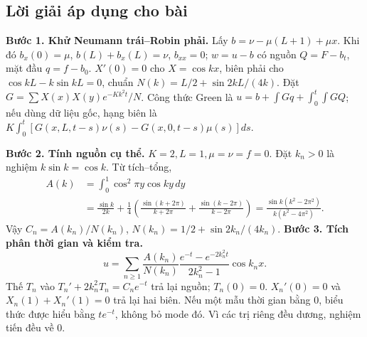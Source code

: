 \documentclass[10pt,a4paper]{article}
\begin{document}
\subsection*{Lời giải áp dụng cho bài}
\textbf{Bước 1. Khử Neumann trái–Robin phải.}
Lấy $b=\nu-\mu(L+1)+\mu x$. Khi đó $b_x(0)=\mu$, $b(L)+b_x(L)=\nu$, $b_{xx}=0$; $w=u-b$ có nguồn $Q=F-b_t$, mặt đầu $q=f-b_0$. $X'(0)=0$ cho $X=\cos kx$, biên phải cho $\cos kL-k\sin kL=0$, chuẩn $N(k)=L/2+\sin2kL/(4k)$. Đặt $G=\sum X(x)X(y)e^{-Kk^2t}/N$. Công thức Green là $u=b+\int Gq+\int_0^t\int GQ$; nếu dùng dữ liệu gốc, hạng biên là $K\int_0^t[G(x,L,t-s)\nu(s)-G(x,0,t-s)\mu(s)]ds$.

\textbf{Bước 2. Tính nguồn cụ thể.}
$K=2,L=1,\mu=\nu=f=0$. Đặt $k_n>0$ là nghiệm $k\sin k=\cos k$. Từ tích–tổng,
\begin{align*}
A(k)&=\int_0^1\cos^2\pi y\cos ky\,dy\\
&=\frac{\sin k}{2k}+\frac14\left(\frac{\sin(k+2\pi)}{k+2\pi}+\frac{\sin(k-2\pi)}{k-2\pi}\right)
=\frac{\sin k(k^2-2\pi^2)}{k(k^2-4\pi^2)}.
\end{align*}
Vậy $C_n=A(k_n)/N(k_n)$, $N(k_n)=1/2+\sin2k_n/(4k_n)$.
\textbf{Bước 3. Tích phân thời gian và kiểm tra.}
\[u=\sum_{n\ge1}\frac{A(k_n)}{N(k_n)}
\frac{e^{-t}-e^{-2k_n^2t}}{2k_n^2-1}\cos k_nx.\]
Thế $T_n$ vào $T_n'+2k_n^2T_n=C_ne^{-t}$ trả lại nguồn; $T_n(0)=0$. $X_n'(0)=0$ và $X_n(1)+X_n'(1)=0$ trả lại hai biên. Nếu một mẫu thời gian bằng $0$, biểu thức được hiểu bằng $te^{-t}$, không bỏ mode đó. Vì các trị riêng đều dương, nghiệm tiến đều về $0$.
\end{document}

